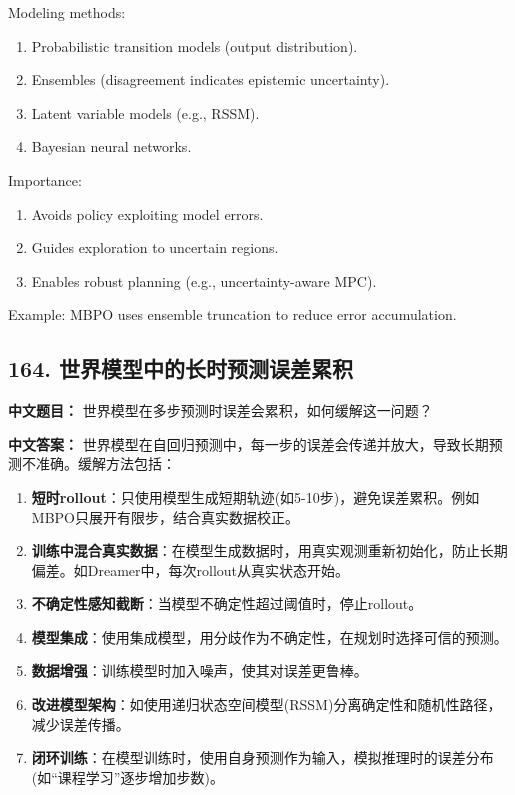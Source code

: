 \documentclass[10pt,a4paper]{ctexart}
\begin{document}
Modeling methods:
\begin{enumerate}
    \item Probabilistic transition models (output distribution).
    \item Ensembles (disagreement indicates epistemic uncertainty).
    \item Latent variable models (e.g., RSSM).
    \item Bayesian neural networks.
\end{enumerate}

Importance:
\begin{enumerate}
    \item Avoids policy exploiting model errors.
    \item Guides exploration to uncertain regions.
    \item Enables robust planning (e.g., uncertainty-aware MPC).
\end{enumerate}

Example: MBPO uses ensemble truncation to reduce error accumulation.

\subsection*{164. 世界模型中的长时预测误差累积}
\textbf{中文题目：} 世界模型在多步预测时误差会累积，如何缓解这一问题？

\textbf{中文答案：}  
世界模型在自回归预测中，每一步的误差会传递并放大，导致长期预测不准确。缓解方法包括：

\begin{enumerate}
    \item \textbf{短时rollout}：只使用模型生成短期轨迹(如5-10步)，避免误差累积。例如MBPO只展开有限步，结合真实数据校正。
    \item \textbf{训练中混合真实数据}：在模型生成数据时，用真实观测重新初始化，防止长期偏差。如Dreamer中，每次rollout从真实状态开始。
    \item \textbf{不确定性感知截断}：当模型不确定性超过阈值时，停止rollout。
    \item \textbf{模型集成}：使用集成模型，用分歧作为不确定性，在规划时选择可信的预测。
    \item \textbf{数据增强}：训练模型时加入噪声，使其对误差更鲁棒。
    \item \textbf{改进模型架构}：如使用递归状态空间模型(RSSM)分离确定性和随机性路径，减少误差传播。
    \item \textbf{闭环训练}：在模型训练时，使用自身预测作为输入，模拟推理时的误差分布(如“课程学习”逐步增加步数)。
\end{enumerate}
\end{document}
